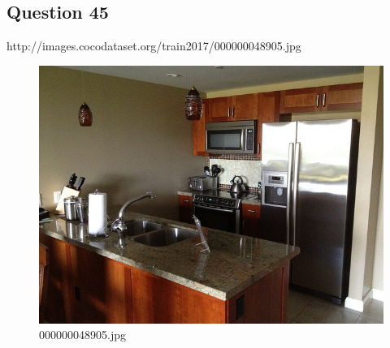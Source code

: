 \subsection*{Question 45}
http://images.cocodataset.org/train2017/000000048905.jpg
\begin{figure}[h]
    \centering
    \includegraphics[width=0.8\linewidth]{../image set/hard/000000048905.jpg}
    \caption{000000048905.jpg}
\end{figure}
